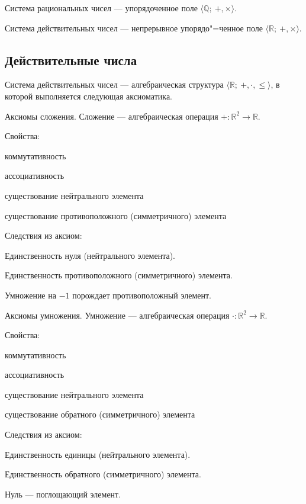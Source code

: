 {\bold Система рациональных чисел} --- упорядоченное поле $\langle\mathbb{Q};\ +,\times
\rangle$.\par

{\bold Система действительных чисел} --- непрерывное упорядо"=ченное поле $\langle\mathbb
{R};\ +,\times\rangle$.

\subsection{Действительные числа}

{\bold Система действительных чисел} --- алгебраическая структура $\langle\mathbb{R};\ +,\cdot,\leq\rangle$, в которой выполняется следующая {\ital аксиоматика}.
\begin{theorem}
{\bold Аксиомы сложения.} {\ital Сложение} --- алгебраическая операция $+\colon\mathbb{R}^2\to\mathbb{R}$.

Свойства:
\begin{list*}[][\#]
\item коммутативность
\item ассоциативность
\item существование нейтрального элемента
\item существование противоположного {\ital (симметричного)} элемента
\end{list*}
Следствия из аксиом:
\begin{list*}[][\#]
\item Единственность нуля {\ital (нейтрального элемента)}.
\item Единственность противоположного {\ital (симметричного)} элемента.
\item Умножение на $-1$ порождает противоположный элемент.
\end{list*}
\end{theorem}

\begin{theorem}
{\bold Аксиомы умножения.} {\ital Умножение} --- алгебраическая операция $\cdot\colon\mathbb{R}^2\to\mathbb{R}$.

Свойства:
\begin{list*}[][\#]
\item коммутативность
\item ассоциативность
\item существование нейтрального элемента
\item существование обратного {\ital (симметричного)} элемента
\end{list*}
Следствия из аксиом:
\begin{list*}[][\#]
\item Единственность единицы {\ital (нейтрального элемента)}.
\item Единственность обратного {\ital (симметричного)} элемента.
\item Нуль --- поглощающий элемент.
\end{list*}
\end{theorem}

